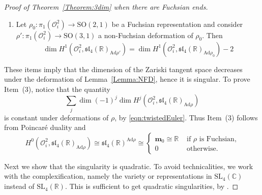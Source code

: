 \documentclass[a4paper,11pt]{article}
\newtheorem{Lemma}[Theorem]{Lemma}
\begin{document}
\begin{proof}[Proof of Theorem~\ref{Theorem:3dim}
 when there are Fuchsian ends]
\begin{enumerate}[(1)]
 \item  Let $\rho_0\colon \pi_1(\mathcal O^2_i)\to\mathrm{SO}(2,1)$ be a Fuchsian representation and consider $\rho'\colon \pi_1(\mathcal O^2_i)\to\mathrm{SO}(3,1)$ a non-Fuchsian deformation of  $\rho_0$. Then
 $$
 \dim H^1(\mathcal O^2_i, \mathfrak{sl}_4(\mathbb R)_{\mathrm{Ad}\rho'})
 =
  \dim H^1(\mathcal O^2_i, \mathfrak{sl}_4(\mathbb R)_{\mathrm{Ad}\rho_0})-2
 $$
\end{enumerate}
These   items  imply that
the dimension of the Zariski tangent space decreases under the deformation
of Lemma~\ref{Lemma:NFD}, hence it is singular.  To prove Item~(3), notice that
the quantity
$$
\sum_j \dim (-1)^j \dim H^j(\mathcal O^2_i, \mathfrak{sl}_4(\mathbb R)_{\mathrm{Ad}\rho})
$$
is constant under deformations of $\rho$, 
by \eqref{eqn:twistedEuler}. Thus Item~(3) follows from Poincar\'e duality and
$$
 H^0(\mathcal O^2_i, \mathfrak{sl}_4(\mathbb R)_{\mathrm{Ad}\rho})\cong
  \mathfrak{sl}_4(\mathbb R)^{\mathrm{Ad}\rho}
 \cong
 \begin{cases}
  \mathbf{m}_0\cong \mathbb R & \textrm{ if } \rho \textrm{ is Fuchsian,}\\
  0 & \textrm{ otherwise.}
 \end{cases}
$$

% 
% 
% 
% 

\bigskip



Next we show that the singularity is quadratic.
To avoid technicalities, we work with the complexification,
namely the variety or representations in 
$\mathrm{SL}_4(\mathbb C)$ instead of 
$\mathrm{SL}_4(\mathbb R)$. This is sufficient
to get quadratic singularities, by \cite[\S 3.3]{GoldmanMillson}. 


\end{proof}
\end{document}
